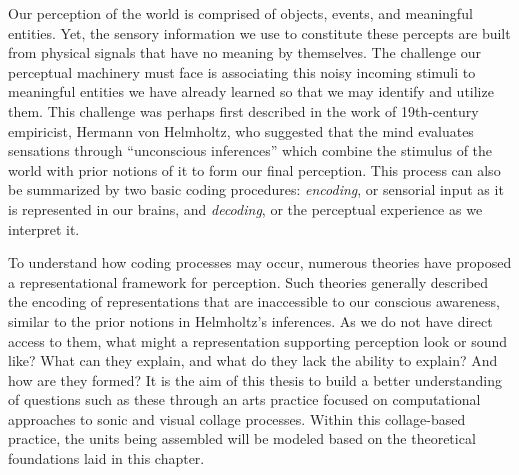 \documentclass[a4paper,10pt,final]{ThesisStyle}
\begin{document}




Our perception of the world is comprised of objects, events, and meaningful entities.  Yet, the sensory information we use to constitute these percepts are built from physical signals that have no meaning by themselves.  The challenge our perceptual machinery must face is associating this noisy incoming stimuli to meaningful entities we have already learned so that we may identify and utilize them.  This challenge was perhaps first described in the work of 19th-century empiricist, Hermann von Helmholtz, who suggested that the mind evaluates sensations through ``unconscious inferences'' which combine the stimulus of the world with prior notions of it to form our final perception. This process can also be summarized by two basic coding procedures: \textit{encoding}, or sensorial input as it is represented in our brains, and \textit{decoding}, or the perceptual experience as we interpret it.

To understand how coding processes may occur, numerous theories have proposed a representational framework for perception.  Such theories generally described the encoding of representations that are inaccessible to our conscious awareness, similar to the prior notions in Helmholtz's inferences.  As we do not have direct access to them, what might a representation supporting perception look or sound like?  What can they explain, and what do they lack the ability to explain?  And how are they formed?  It is the aim of this thesis to build a better understanding of questions such as these through an arts practice focused on computational approaches to sonic and visual collage processes.  Within this collage-based practice, the units being assembled will be modeled based on the theoretical foundations laid in this chapter.  
\end{document}

